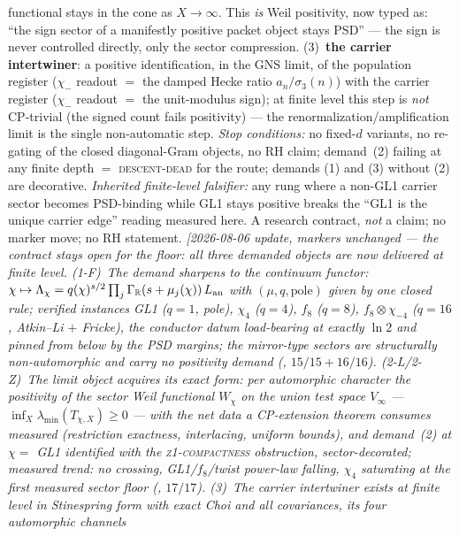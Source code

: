 \documentclass[11pt,a4paper]{article}
\begin{document}
{functional stays in the cone as $X\to\infty$.  This \emph{is} Weil
positivity, now typed as: ``the sign sector of a manifestly
positive packet object stays PSD'' --- the sign is never
controlled directly, only the sector compression.
(3)~\textbf{the carrier intertwiner}: a positive identification,
in the GNS limit, of the population register ($\chi_-$ readout $=$
the damped Hecke ratio $a_n/\sigma_3(n)$) with the carrier
register ($\chi_-$ readout $=$ the unit-modulus sign); at finite
level this step is \emph{not} CP-trivial (the signed count fails
positivity) --- the renormalization/amplification limit is the
single non-automatic step.  \emph{Stop conditions:} no fixed-$d$
variants, no re-gating of the closed diagonal-Gram objects, no RH
claim; demand~(2) failing at any finite depth $=$
\textsc{descent-dead} for the route; demands (1) and (3) without
(2) are decorative.  \emph{Inherited finite-level falsifier:} any
rung where a non-GL1 carrier sector becomes PSD-binding while GL1
stays positive breaks the ``GL1 is the unique carrier edge''
reading measured here.  A research contract, \emph{not} a claim;
no marker move; no RH statement.
\emph{[2026-08-06 update, markers unchanged --- the contract stays
open for the floor: all three demanded objects are now delivered
at finite level.  (1-F)~The demand sharpens to the \emph{continuum
functor}: $\chi\mapsto\Lambda_\chi=q(\chi)^{s/2}\prod_j
\Gamma_{\mathbb R}(s+\mu_j(\chi))\,L_{\rm an}$ with
$(\mu,q,\text{pole})$ given by one closed rule; verified instances
GL1 ($q{=}1$, pole), $\chi_4$ ($q{=}4$), $f_8$ ($q{=}8$),
$f_8\otimes\chi_{-4}$ ($q{=}16$, Atkin--Li $+$ Fricke), the
conductor datum load-bearing at exactly $\ln2$ and pinned from
below by the PSD margins; the mirror-type sectors are structurally
non-automorphic and carry no positivity demand
(, $15/15+16/16$).
(2-L/2-Z)~The limit object acquires its exact form: per
automorphic character the positivity of the sector Weil functional
$W_\chi$ on the union test space $V_\infty$ ---
$\inf_X\lambda_{\min}(T_{\chi,X})\ge0$ --- with the net data a
CP-extension theorem consumes \emph{measured} (restriction
exactness, interlacing, uniform bounds), and demand~(2) at
$\chi=$ GL1 identified with the \textsc{z1-compactness}
obstruction, sector-decorated; measured trend: no crossing,
GL1/$f_8$/twist power-law falling, $\chi_4$ saturating at the
first measured sector floor
(, $17/17$).  (3)~The carrier
intertwiner \emph{exists} at finite level in Stinespring form with
exact Choi and all covariances, its four automorphic channels
}}
\end{document}
